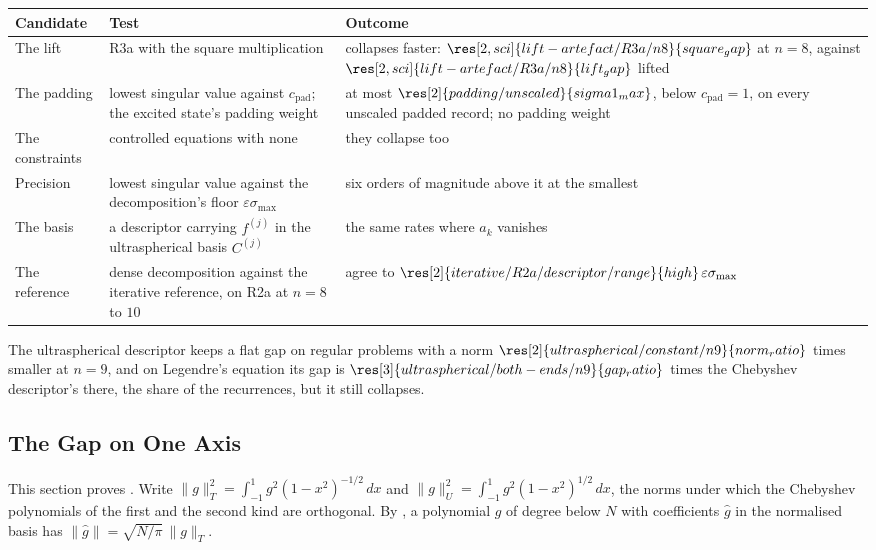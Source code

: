 \begin{center}
\small
\begin{tabular}{@{}p{} p{} p{}@{}}
\toprule
Candidate & Test & Outcome \\
\midrule
The lift & R3a with the square multiplication & collapses faster: $\res[2,sci]{lift-artefact/R3a/n8}{square_gap}$ at $n=8$, against $\res[2,sci]{lift-artefact/R3a/n8}{lift_gap}$ lifted \\
The padding & lowest singular value against $c_{\mathrm{pad}}$; the excited state's padding weight & at most $\res[2]{padding/unscaled}{sigma1_max}$, below $c_{\mathrm{pad}}=1$, on every unscaled padded record; no padding weight \\
The constraints & controlled equations with none & they collapse too \\
Precision & lowest singular value against the decomposition's floor $\varepsilon\sigma_{\max}$ & six orders of magnitude above it at the smallest \\
The basis & a descriptor carrying $f^{(j)}$ in the ultraspherical basis $C^{(j)}$ & the same rates where $a_k$ vanishes \\
The reference & dense decomposition against the iterative reference, on R2a at $n=8$ to $10$ & agree to $\res[2]{iterative/R2a/descriptor/range}{high}\,\varepsilon\sigma_{\max}$ \\
\bottomrule
\end{tabular}
\end{center}

The ultraspherical descriptor keeps a flat gap on regular problems with a norm $\res[2]{ultraspherical/constant/n9}{norm_ratio}$ times smaller at $n=9$, and on Legendre's equation its gap is $\res[3]{ultraspherical/both-ends/n9}{gap_ratio}$ times the Chebyshev descriptor's there, the share of the recurrences, but it still collapses.

\subsection{The Gap on One Axis}
\label{app:flat-gap}

This section proves . Write $\|g\|_T^2=\int_{-1}^1g^2(1-x^2)^{-1/2}\,dx$ and $\|g\|_U^2=\int_{-1}^1g^2(1-x^2)^{1/2}\,dx$, the norms under which the Chebyshev polynomials of the first and the second kind are orthogonal. By , a polynomial $g$ of degree below $N$ with coefficients $\hat g$ in the normalised basis has $\|\hat g\|=\sqrt{N/\pi}\,\|g\|_T$.

